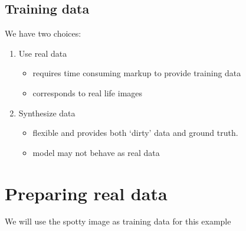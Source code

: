 \documentclass[letterpaper,10pt,english]{sphinxmanual}
\begin{document}
\subsection{Training data}
\label{\detokenize{ML4NeutronImageSegmentation:training-data}}
We have two choices:
\begin{enumerate}
%
\item {} 
Use real data
\begin{itemize}
\item {} 
requires time consuming markup to provide training data

\item {} 
corresponds to real life images

\end{itemize}

\item {} 
Synthesize data
\begin{itemize}
\item {} 
flexible and provides both ‘dirty’ data and ground truth.

\item {} 
model may not behave as real data

\end{itemize}

\end{enumerate}


\section{Preparing real data}
\label{\detokenize{ML4NeutronImageSegmentation:preparing-real-data}}
We will use the spotty image as training data for this example


\begin{sphinxVerbatim}[commandchars=\\\{\}]
\PYG{p}{[}\PYG{p}{]} \PYG{p}{[}\PYG{p}{]}
\PYG{p}{[}\PYG{p}{]} \PYG{p}{[}\PYG{p}{]}
\end{sphinxVerbatim}
\end{document}
